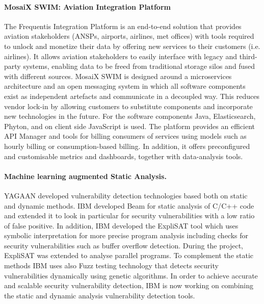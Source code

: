 \documentclass[a4paper,11pt]{article}
\begin{document}
\paragraph{\FRQshort{} MosaiX SWIM: Aviation Integration Platform}
\label{sec:swim}
The Frequentis Integration Platform is an end-to-end solution that provides aviation stakeholders (ANSPs, airports, airlines, met offices) with tools required to unlock and monetize their data by offering new services to their customers (i.e. airlines). It allows aviation stakeholders to easily interface with legacy and third-party systems, enabling data to be freed from traditional storage silos and fused with different sources. MosaiX SWIM is designed around a microservices architecture and an open messaging system in which all software components exist as independent artefacts and communicate in a decoupled way. This reduces vendor lock-in by allowing customers to substitute components and incorporate new technologies in the future. For the software components  Java, Elasticsearch, Phyton, and on client side JavaScript is used. The platform provides an efficient API Manager and tools for billing consumers of services using models such as hourly billing or consumption-based billing. In addition, it offers preconfigured and customisable metrics and dashboards, together with data-analysis tools.



\paragraph{\YAGshort{} Machine learning augmented Static Analysis.}

YAGAAN developed vulnerability detection technologies based both on static and dynamic methods. IBM developed Beam for static analysis of C/C++ code and extended it to look in particular for security vulnerabilities with a low ratio of false positive. In addition, IBM developed the ExpliSAT tool which uses symbolic interpretation for more precise program analysis including checks for security vulnerabilities such as buffer overflow detection. During the \rephrase{} project, ExpliSAT was extended to analyse parallel programs. To complement the static methods IBM uses also Fuzz testing technology that detects security vulnerabilities dynamically using genetic algorithms. In order to achieve accurate and scalable security vulnerability detection, IBM is now working on combining the static and dynamic analysis vulnerability detection tools.     
\end{document}
